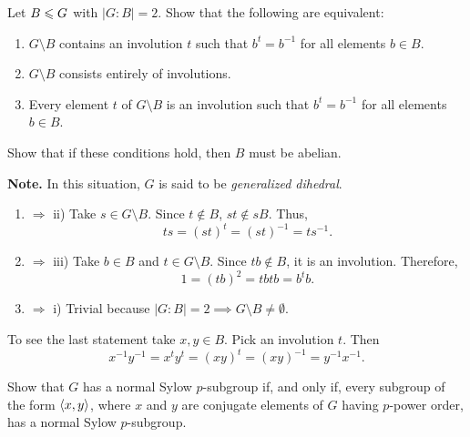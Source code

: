\begin{probl}
    Let\/ $B\leqslant G$ with\/ $|G:B|=2$. Show that the following are equivalent:
    \begin{enumerate}[\rm i)]
    \item $G\setminus B$ contains an involution\/ $t$ such that\/ $b^t=b^{-1}$ for all elements $b\in B$.
    \item $G\setminus B$ consists entirely of involutions.
    \item Every element\/ $t$ of\/ $G\setminus B$ is an involution such that\/ $b^t=b^{-1}$ for all elements\/ $b\in B$.
    \end{enumerate}
    Show that if these conditions hold, then\/ $B$ must be abelian.

    \textrm{\rm{\bf Note.} In this situation, $G$ is said to be \textsl{generalized dihedral}.}
\end{probl}

\begin{solution}
\begin{enumerate}[\rm i)]
    \item $\Rightarrow$ ii) Take $s\in G\setminus B$. Since $t\notin B$, $st\notin sB$. Thus,
    $$
        ts=(st)^t=(st)^{-1}=ts^{-1}.
    $$

    \item $\Rightarrow$ iii) Take $b\in B$ and $t\in G\setminus B$. Since $tb\notin B$, it is an involution. Therefore,
    $$
        1 = (tb)^2 = tbtb = b^tb.
    $$

    \item $\Rightarrow$ i) Trivial because $|G:B|=2\implies G\setminus B\ne\emptyset$.
\end{enumerate}

To see the last statement take $x,y\in B$. Pick an involution $t$. Then
$$
    x^{-1}y^{-1}=x^ty^t = (xy)^t = (xy)^{-1}=y^{-1}x^{-1}.
$$
 \end{solution}

\begin{probl}
    Show that\/ $G$ has a normal Sylow\/ $p$-subgroup if, and only if, every subgroup of the form\/ $\langle x,y\rangle$, where\/ $x$ and\/ $y$ are conjugate elements of\/ $G$ having\/ $p$-power order, has a normal Sylow\/ $p$-subgroup.
\end{probl}

